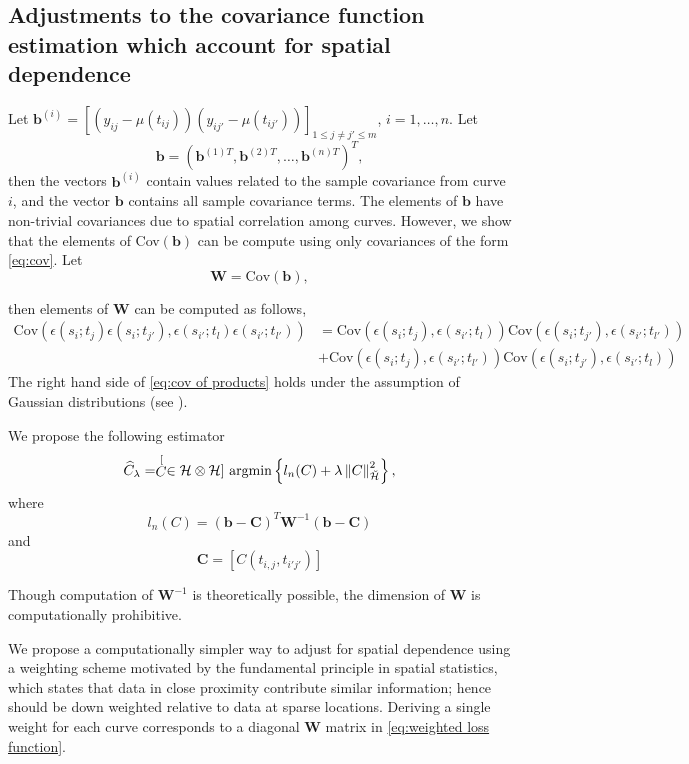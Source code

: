 \newpage
\subsection{Adjustments to the covariance function estimation which account for spatial dependence}
\label{sec:adjustments to the covariance}

Let $\mathbf{b}^{(i)} = [(y_{ij}-\mu(t_{ij}))(y_{ij'}-\mu(t_{ij'}))]_{1\leq j\neq j'\leq m}$, $i=1, \dots, n$. Let
\[
\mathbf{b} = (\mathbf{b}^{(1)T}, \mathbf{b}^{(2)T}, \dots, \mathbf{b}^{(n)T}   )^T,
\]
then the vectors $\mathbf{b}^{(i)}$ contain values related to the sample covariance from curve $i$, and the vector $\mathbf{b}$ contains all sample covariance terms. 
 	The elements of $\mathbf{b}$ have non-trivial covariances due to spatial correlation among curves. However, we show that the elements of Cov$(\mathbf{b})$ can be compute using only covariances of the form \eqref{eq:cov}. Let
\[
\mathbf{W}= \text{Cov}(\mathbf{b}), 
\]

then elements of $\mathbf{W}$ can be computed as follows,
\begin{align} 
	\text{Cov}(\epsilon(s_i; t_{j}) \epsilon(s_i;t_{j'}), \epsilon(s_{i'}; t_{l}) \epsilon(s_{i'};t_{l'}) ) 
	&= 
	  \text{Cov}(\epsilon(s_i; t_{j}), \epsilon(s_{i'}; t_{l}))\text{Cov}( \epsilon(s_i;t_{j'}), \epsilon(s_{i'};t_{l'})  ) \nonumber \\
	&+
		 \text{Cov}(\epsilon(s_i; t_{j}),  \epsilon(s_{i'};t_{l'}) )\text{Cov}(\epsilon(s_i;t_{j'}), \epsilon(s_{i'}; t_{l})) \label{eq:cov of products}
\end{align}
The right hand side of \eqref{eq:cov of products} holds under the assumption of Gaussian distributions (see \cite{Bohrnstedt:2010ud}). 

We propose the following estimator
\[
\widehat{C}_{\lambda}=\stackrel[C \in \mathcal{H}\otimes \mathcal{H}]{}{\text{ argmin}} \left\{ l_{n}(C)+\lambda\left\Vert C\right\Vert _{\breve{\mathcal{H}}}^{2} \right\},
\]
where
\begin{equation}
l_{n}(C)= (\mathbf{b} - \mathbf{C})^T\mathbf{W}^{-1}(\mathbf{b} - \mathbf{C})
\label{eq:weighted loss function}
\end{equation}
and 
\[
\mathbf{C} = [C(t_{i,j}, t_{i'j'})]
\]


 Though computation of $\mathbf{W}^{-1}$ is theoretically possible, the dimension of $\mathbf{W}$ is computationally prohibitive. 
 
 We propose a computationally simpler way to adjust for spatial dependence using a weighting scheme motivated by the fundamental principle in spatial statistics, which states that data in close proximity contribute similar information; hence should be down weighted relative to data at sparse locations. Deriving a single weight for each curve corresponds to a diagonal $\mathbf{W}$ matrix in \eqref{eq:weighted loss function}. 
 
